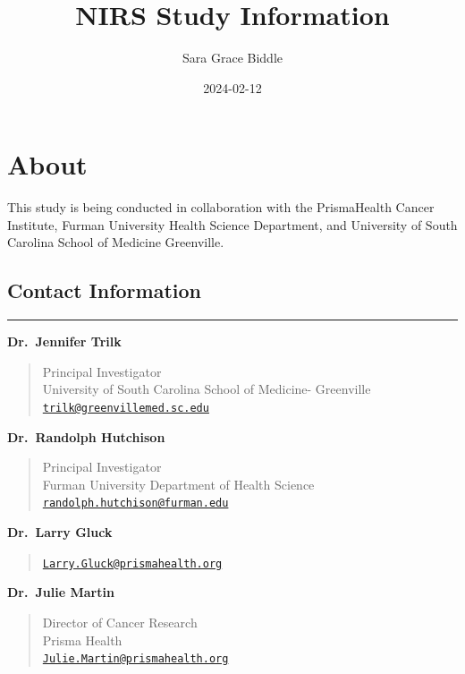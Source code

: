 \documentclass[
]{book}
\title{NIRS Study Information}
\author{Sara Grace Biddle}
\date{2024-02-12}
\begin{document}
\maketitle

{
\setcounter{tocdepth}{1}
\tableofcontents
}
\hypertarget{about}{%
\chapter{About}\label{about}}

This study is being conducted in collaboration with the PrismaHealth Cancer Institute, Furman University Health Science Department, and University of South Carolina School of Medicine Greenville.

\hypertarget{contact-information}{%
\section{Contact Information}\label{contact-information}}

\begin{center}\rule{0.5\linewidth}{0.5pt}\end{center}

\textbf{Dr.~Jennifer Trilk}

\begin{quote}
Principal Investigator\\
University of South Carolina School of Medicine- Greenville\\
\href{mailto:trilk@greenvillemed.sc.edu}{\nolinkurl{trilk@greenvillemed.sc.edu}}
\end{quote}

\textbf{Dr.~Randolph Hutchison}

\begin{quote}
Principal Investigator\\
Furman University Department of Health Science\\
\href{mailto:randolph.hutchison@furman.edu}{\nolinkurl{randolph.hutchison@furman.edu}}
\end{quote}

\textbf{Dr.~Larry Gluck}

\begin{quote}
\href{mailto:Larry.Gluck@prismahealth.org}{\nolinkurl{Larry.Gluck@prismahealth.org}}
\end{quote}

\textbf{Dr.~Julie Martin}

\begin{quote}
Director of Cancer Research\\
Prisma Health\\
\href{mailto:Julie.Martin@prismahealth.org}{\nolinkurl{Julie.Martin@prismahealth.org}}
\end{quote}
\end{document}
